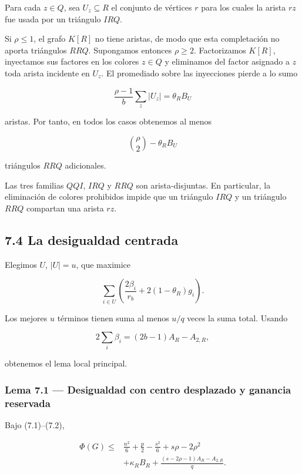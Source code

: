 \documentclass[
  11pt,
]{article}
\begin{document}
Para cada \(z\in Q\), sea \(U_z\subseteq R\) el conjunto de vértices \(r\) para los cuales la arista \(rz\) fue usada por un triángulo \(IRQ\).

Si \(\rho\le1\), el grafo \(K[R]\) no tiene aristas, de modo que esta completación no aporta triángulos \(RRQ\). Supongamos entonces \(\rho\ge2\). Factorizamos \(K[R]\), inyectamos sus factores en los colores \(z\in Q\) y eliminamos del factor asignado a \(z\) toda arista incidente en \(U_z\). El promediado sobre las inyecciones pierde a lo sumo

\[
\frac{\rho-1}{b}\sum_z|U_z|
=
\theta_RB_U
\]

aristas. Por tanto, en todos los casos obtenemos al menos

\[
\binom\rho2-\theta_RB_U
\]

triángulos \(RRQ\) adicionales.

Las tres familias \(QQI\), \(IRQ\) y \(RRQ\) son arista-disjuntas. En particular, la eliminación de colores prohibidos impide que un triángulo \(IRQ\) y un triángulo \(RRQ\) compartan una arista \(rz\).

\subsection{7.4 La desigualdad centrada}\label{la-desigualdad-centrada}

Elegimos \(U\), \(|U|=u\), que maximice

\[
\sum_{i\in U}
\left(
\frac{2\beta_i}{r_b}+2(1-\theta_R)g_i
\right).
\]

Los mejores \(u\) términos tienen suma al menos \(u/q\) veces la suma total. Usando

\[
2\sum_i\beta_i
=(2b-1)A_R-A_{2,R},
\]

obtenemos el lema local principal.

\subsubsection{Lema 7.1 --- Desigualdad con centro desplazado y ganancia reservada}\label{lema-7.1-desigualdad-con-centro-desplazado-y-ganancia-reservada}

Bajo (7.1)--(7.2),

\[
\boxed{
\begin{aligned}
\Phi(G)
\le{}&
\frac{n^2}{6}+\frac p2-\frac{s^2}{6}
+s\rho-2\rho^2\\
&+
\kappa_RB_R
+
\frac{(s-2\rho-1)A_R-A_{2,R}}q.
\end{aligned}
}
\tag{7.6}
\]
\end{document}
